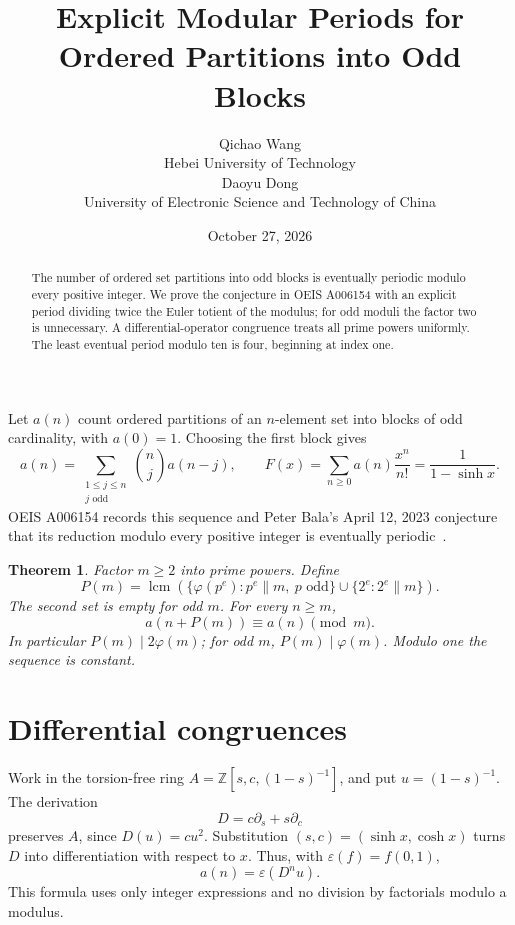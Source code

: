 \documentclass[10pt]{article}
\title{Explicit Modular Periods for Ordered Partitions into Odd Blocks}
\author{Qichao Wang\\{\small Hebei University of Technology}\\[.3em]
Daoyu Dong\\{\small University of Electronic Science and Technology of China}}
\date{October 27, 2026}
\newtheorem{theorem}{Theorem}
\begin{document}
\maketitle
\begin{abstract}
The number of ordered set partitions into odd blocks is eventually
periodic modulo every positive integer. We prove the conjecture in
OEIS A006154 with an explicit period dividing twice the Euler
totient of the modulus; for odd moduli the factor two is unnecessary.
A differential-operator congruence treats all prime powers uniformly.
The least eventual period modulo ten is four, beginning at index one.
\end{abstract}

Let $a(n)$ count ordered partitions of an $n$-element set into blocks
of odd cardinality, with $a(0)=1$. Choosing the first block gives
\[
 a(n)=\sum_{\substack{1\le j\le n\\ j\text{ odd}}}
       \binom nj a(n-j),\qquad
 F(x)=\sum_{n\ge0}a(n)\frac{x^n}{n!}=\frac1{1-\sinh x}.
\]
OEIS A006154 records this sequence and Peter Bala's April 12, 2023
conjecture that its reduction modulo every positive integer is
eventually periodic~\cite{oeis}.

\begin{theorem}\label{thm:main}
Factor $m\ge2$ into prime powers. Define
\[
 P(m)=\operatorname{lcm}\left(
 \{\varphi(p^e):p^e\parallel m,\ p\text{ odd}\}
 \cup\{2^e:2^e\parallel m\}\right).
\]
The second set is empty for odd $m$. For every $n\ge m$,
\[
 a(n+P(m))\equiv a(n)\pmod m.
\]
In particular $P(m)\mid2\varphi(m)$; for odd $m$,
$P(m)\mid\varphi(m)$. Modulo one the sequence is constant.
\end{theorem}

\section{Differential congruences}
Work in the torsion-free ring
$A=\mathbb Z[s,c,(1-s)^{-1}]$, and put $u=(1-s)^{-1}$.
The derivation
\[
 D=c\partial_s+s\partial_c
\]
preserves $A$, since $D(u)=cu^2$. Substitution
$(s,c)=(\sinh x,\cosh x)$ turns $D$ into differentiation with
respect to $x$. Thus, with $\varepsilon(f)=f(0,1)$,
\begin{equation}\label{eq:evaluation}
 a(n)=\varepsilon(D^n u).
\end{equation}
This formula uses only integer expressions and no division by
factorials modulo a modulus.
\end{document}
